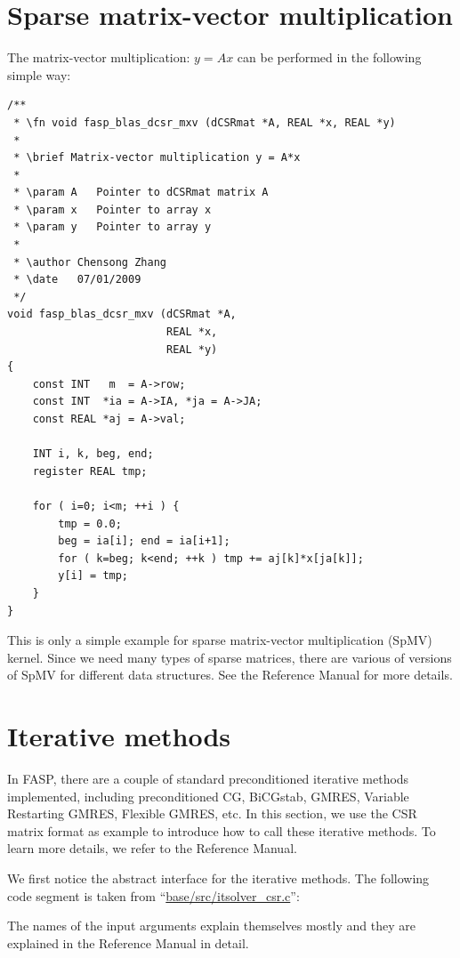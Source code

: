 \documentclass[11pt]{memoir}
\begin{document}
\section{Sparse matrix-vector multiplication}

The matrix-vector multiplication: $y=Ax$ can be performed in the
following simple way:

\begin{lstlisting}
/**
 * \fn void fasp_blas_dcsr_mxv (dCSRmat *A, REAL *x, REAL *y)
 *
 * \brief Matrix-vector multiplication y = A*x
 *
 * \param A   Pointer to dCSRmat matrix A
 * \param x   Pointer to array x
 * \param y   Pointer to array y
 *
 * \author Chensong Zhang
 * \date   07/01/2009
 */
void fasp_blas_dcsr_mxv (dCSRmat *A,
                         REAL *x,
                         REAL *y)
{
    const INT   m  = A->row;
    const INT  *ia = A->IA, *ja = A->JA;
    const REAL *aj = A->val;

    INT i, k, beg, end;
    register REAL tmp;

    for ( i=0; i<m; ++i ) {
        tmp = 0.0;
        beg = ia[i]; end = ia[i+1];
        for ( k=beg; k<end; ++k ) tmp += aj[k]*x[ja[k]];
        y[i] = tmp;
    }
}
\end{lstlisting}

This is only a simple example for sparse matrix-vector multiplication (SpMV) kernel. Since we need many types of sparse matrices, there are various of versions of SpMV for different data structures. See the Reference Manual for more details.

\section{Iterative methods}\label{sec:iter}

In FASP, there are a couple of standard preconditioned iterative methods~\cite{Saad.Saad.2003fv} implemented, including preconditioned CG, BiCGstab, GMRES, Variable Restarting GMRES, Flexible GMRES, etc. In this section, we use the CSR matrix format as example to introduce how to call these iterative methods. To learn more details, we refer to the Reference Manual.

We first notice the abstract interface for the iterative methods. The following code segment is taken from ``\url{base/src/itsolver\_csr.c}'':
%

%
The names of the input arguments explain themselves mostly and they are explained in the Reference Manual in detail.
\end{document}
